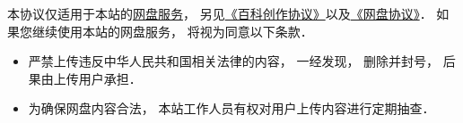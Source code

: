 
本协议仅适用于本站的\href{http://example.com}{网盘服务}， 另见\href{http://wuli.wiki/online/licens.html}{《百科创作协议》}以及\href{http://www.example.com}{《网盘协议》}． 如果您继续使用本站的网盘服务， 将视为同意以下条款．

\begin{itemize}
\item 严禁上传违反中华人民共和国相关法律的内容， 一经发现， 删除并封号， 后果由上传用户承担．
\item 为确保网盘内容合法， 本站工作人员有权对用户上传内容进行定期抽查．
\end{itemize}

